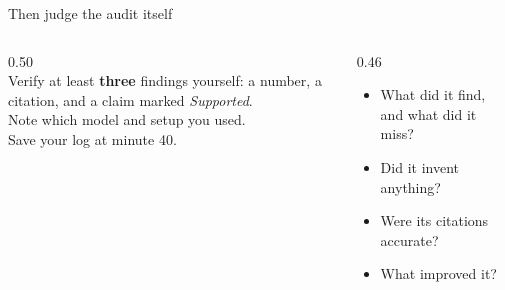 \begin{frame}{Then judge the audit itself}
  \vfill
  \begin{columns}[c]
    \begin{column}{0.50\textwidth}
      \\[0.9em]
      {\small Verify at least \textbf{three} findings yourself: a number, a citation, and a claim marked \emph{Supported}.}\\[0.6em]
      {\small Note which model and setup you used.}\\[0.6em]
      {\small Save your log at minute 40.}
    \end{column}
    \begin{column}{0.46\textwidth}
      \begin{itemize}\small\setlength\itemsep{0.55em}
        \item What did it find, and what did it miss?
        \item Did it invent anything?
        \item Were its citations accurate?
        \item What improved it?
      \end{itemize}
    \end{column}
  \end{columns}
  \vspace{1.4cm plus 1fill}
\end{frame}
